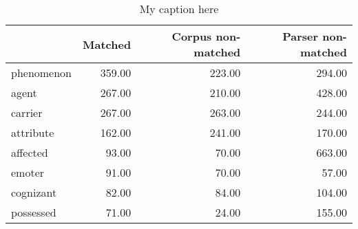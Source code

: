 \begin{table}[!ht]
\centering
\begin{tabular}{lrrr}
\toprule
{} &  Matched &  Corpus non-matched &  Parser non-matched \\
\midrule
phenomenon &   359.00 &              223.00 &              294.00 \\
agent      &   267.00 &              210.00 &              428.00 \\
carrier    &   267.00 &              263.00 &              244.00 \\
attribute  &   162.00 &              241.00 &              170.00 \\
affected   &    93.00 &               70.00 &              663.00 \\
emoter     &    91.00 &               70.00 &               57.00 \\
cognizant  &    82.00 &               84.00 &              104.00 \\
possessed  &    71.00 &               24.00 &              155.00 \\
\bottomrule
\end{tabular}
\caption{My caption here}
\label{tab:PARTICIPANT_ROLE-oe-data}
\end{table}